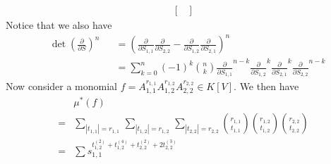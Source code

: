 \begin{example}
\begin{equation}
\begin{aligned}
\begin{bmatrix}
      \end{bmatrix}
    \end{aligned}
  \end{equation}
  Notice that we also have
  \begin{equation}
    \begin{aligned}
      &\operatorname{det}\left( \frac{\partial}{\partial S} \right)^n
      &&= \left( \frac{\partial}{\partial S_{1,1}} \frac{\partial}{\partial S_{2,2}} - \frac{\partial}{\partial S_{1,2}} \frac{\partial}{\partial S_{2,1}} \right)^n \\
      &&&= \sum_{k=0}^n (-1)^k \binom{n}{k} \frac{\partial}{\partial S_{1,1}}^{n-k} \frac{\partial}{\partial S_{1,2}}^k \frac{\partial}{\partial S_{2,1}}^k \frac{\partial}{\partial S_{2,2}}^{n-k}
    \end{aligned}
  \end{equation}
  Now consider a monomial $ f = A_{1,1}^{r_{1,1}} A_{1,2}^{r_{1,2}} A_{2,2}^{r_{2,2}} \in K[V] $.
  We then have
  \begin{equation}
    \begin{aligned}
      & \mu^\ast (f) \\
      =& \sum_{|t_{1,1}| = r_{1,1}} \, \sum_{|t_{1,2}| = r_{1,2}} \, \sum_{|t_{2,2}| = r_{2,2}} \binom{r_{1,1}}{t_{1,1}} \binom{r_{1,2}}{t_{1,2}} \binom{r_{2,2}}{t_{2,2}}\\
      =& \sum s_{1,1}^{ t_{1,2}^{(2)} + t_{1,2}^{(4)} + t_{2,2}^{(2)} + 2t_{2,2}^{(3)}}
    \end{aligned}
  \end{equation}
\end{example}

